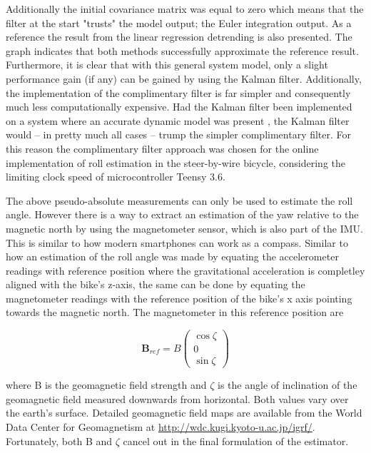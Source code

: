Additionally the initial covariance matrix was equal to zero which means that the filter at the start "trusts" the model output; the Euler integration output. As a reference the result from the linear regression detrending is also presented. The graph indicates that both methods successfully approximate the reference result. Furthermore, it is clear that with this general system model, only a slight performance gain (if any) can be gained by using the Kalman filter. Additionally, the implementation of the complimentary filter is far simpler and consequently much less computationally expensive. Had the Kalman filter been implemented on a system where  an accurate dynamic model was present , the Kalman filter would – in pretty much all cases – trump the simpler complimentary filter. For this reason the complimentary filter approach was chosen for the online implementation of roll estimation in the steer-by-wire bicycle, considering the limiting clock speed of microcontroller Teensy 3.6.

The above pseudo-absolute measurements can only be used to estimate the roll angle. However there is a way to extract an estimation of the yaw relative to the magnetic north by using the magnetometer sensor, which is also part of the IMU. This is similar to how modern smartphones can work as a compass. Similar to how an estimation of the roll angle was made by equating the accelerometer readings with  reference position where the gravitational acceleration is completley aligned with the bike's z-axis, the same can be done by equating the magnetometer readings with the reference position of the bike's x axis pointing towards the magnetic north. The magnetometer in this reference position are 

\begin{equation}
\boldsymbol{B}_{ref}=B\left(\begin{array}{c}{\cos \zeta} \\ {0} \\ {\sin \zeta}\end{array}\right)
\end{equation}

where B is the geomagnetic field strength and \ensuremath{\zeta} is the angle of inclination of the geomagnetic field measured downwards from horizontal. Both values vary over the earth's surface. Detailed geomagnetic field maps are available from the World Data Center for Geomagnetism at \hyperref[site]{http://wdc.kugi.kyoto-u.ac.jp/igrf/}. Fortunately, both B and \ensuremath{\zeta} cancel out in the final formulation of the estimator.


